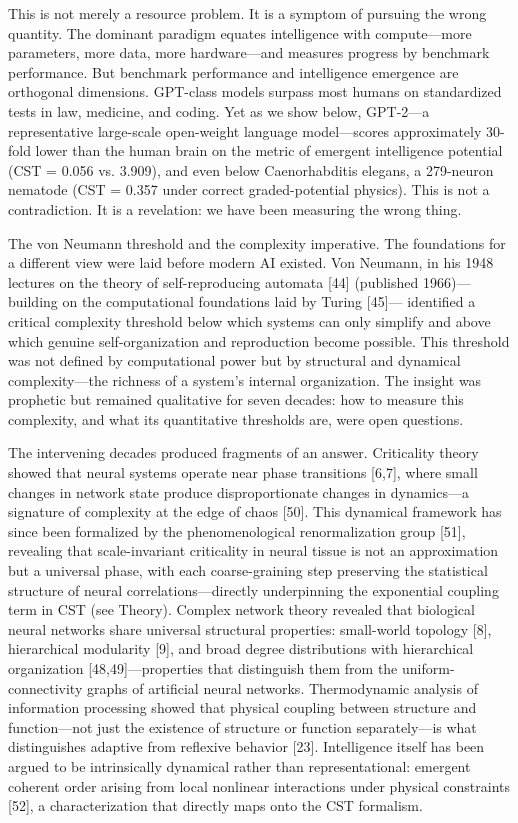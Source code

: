 \documentclass[a4paper,12pt]{article}
\begin{document}
This is not merely a resource problem.
It is a symptom of pursuing the wrong quantity.
The dominant paradigm equates intelligence with compute---more parameters, more data, more hardware---and measures progress by benchmark performance.
But benchmark performance and intelligence emergence are orthogonal dimensions.
GPT-class models surpass most humans on standardized tests in law, medicine, and coding.
Yet as we show below, GPT-2---a representative large-scale open-weight language model---scores approximately 30-fold lower than the human brain on the metric of emergent intelligence potential (CST = 0.056 vs. 3.909), and even below Caenorhabditis elegans, a 279-neuron nematode (CST = 0.357 under correct graded-potential physics).
This is not a contradiction.
It is a revelation: we have been measuring the wrong thing.


The von Neumann threshold and the complexity imperative.
The foundations for a different view were laid before modern AI existed.
Von Neumann, in his 1948 lectures on the theory of self-reproducing automata [44] (published 1966)---building on the computational foundations laid by Turing [45]--- identified a critical complexity threshold below which systems can only simplify and above which genuine self-organization and reproduction become possible.
This threshold was not defined by computational power but by structural and dynamical complexity---the richness of a system's internal organization.
The insight was prophetic but remained qualitative for seven decades: how to measure this complexity, and what its quantitative thresholds are, were open questions.


The intervening decades produced fragments of an answer.
Criticality theory showed that neural systems operate near phase transitions [6,7], where small changes in network state produce disproportionate changes in dynamics---a signature of complexity at the edge of chaos [50].
This dynamical framework has since been formalized by the phenomenological renormalization group [51], revealing that scale-invariant criticality in neural tissue is not an approximation but a universal phase, with each coarse-graining step preserving the statistical structure of neural correlations---directly underpinning the exponential coupling term in CST (see Theory).
Complex network theory revealed that biological neural networks share universal structural properties: small-world topology [8], hierarchical modularity [9], and broad degree distributions with hierarchical organization [48,49]---properties that distinguish them from the uniform-connectivity graphs of artificial neural networks.
Thermodynamic analysis of information processing showed that physical coupling between structure and function---not just the existence of structure or function separately---is what distinguishes adaptive from reflexive behavior [23].
Intelligence itself has been argued to be intrinsically dynamical rather than representational: emergent coherent order arising from local nonlinear interactions under physical constraints [52], a characterization that directly maps onto the CST formalism.
\end{document}
